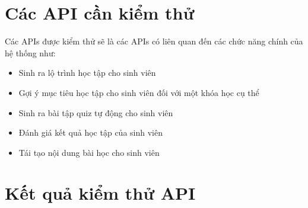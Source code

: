 \section{Các API cần kiểm thử}
Các APIs được kiểm thử sẽ là các APIs có liên quan đến các chức năng chính của hệ thống như:
\begin{itemize}
    \item Sinh ra lộ trình học tập cho sinh viên
    \item Gợi ý mục tiêu học tập cho sinh viên đối với một khóa học cụ thể
    \item Sinh ra bài tập quiz tự động cho sinh viên
    \item Đánh giá kết quả học tập của sinh viên
    \item Tái tạo nội dung bài học cho sinh viên
\end{itemize}

\section{Kết quả kiểm thử API}
